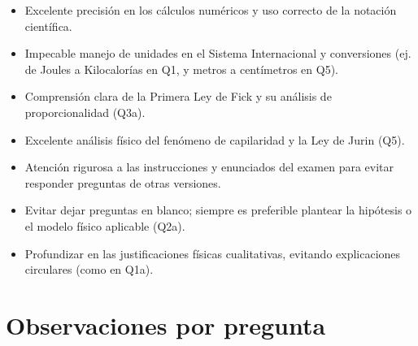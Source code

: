 \documentclass[11pt,a4paper]{article}
\begin{document}
\vspace{4pt}
\begin{minipage}[t]{0.48\linewidth}
  \begin{tcolorbox}[cajaFortaleza, title={Fortalezas}]
\begin{itemize}[leftmargin=1.5em, itemsep=2pt]
  \item Excelente precisión en los cálculos numéricos y uso correcto de la notación científica.
  \item Impecable manejo de unidades en el Sistema Internacional y conversiones (ej. de Joules a Kilocalorías en Q1, y metros a centímetros en Q5).
  \item Comprensión clara de la Primera Ley de Fick y su análisis de proporcionalidad (Q3a).
  \item Excelente análisis físico del fenómeno de capilaridad y la Ley de Jurin (Q5).
\end{itemize}
  \end{tcolorbox}
\end{minipage}
\hfill
\begin{minipage}[t]{0.48\linewidth}
  \begin{tcolorbox}[cajaMejora, title={Areas de mejora}]
\begin{itemize}[leftmargin=1.5em, itemsep=2pt]
  \item Atención rigurosa a las instrucciones y enunciados del examen para evitar responder preguntas de otras versiones.
  \item Evitar dejar preguntas en blanco; siempre es preferible plantear la hipótesis o el modelo físico aplicable (Q2a).
  \item Profundizar en las justificaciones físicas cualitativas, evitando explicaciones circulares (como en Q1a).
\end{itemize}
  \end{tcolorbox}
\end{minipage}

\section*{Observaciones por pregunta}
\end{document}
